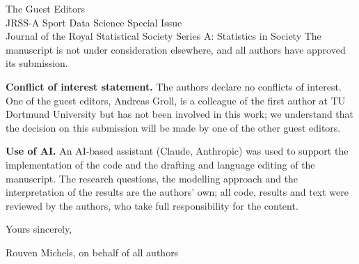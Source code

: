 \documentclass[11pt,a4paper]{letter}
\begin{document}
\begin{letter}{The Guest Editors\\ JRSS-A Sport Data Science Special Issue\\ Journal of the Royal Statistical Society Series A: Statistics in Society}
The manuscript is not under consideration elsewhere, and all authors have approved its submission.

\textbf{Conflict of interest statement.} The authors declare no conflicts of interest. One of the guest editors, Andreas Groll, is a colleague of the first author at TU Dortmund University but has not been involved in this work; we understand that the decision on this submission will be made by one of the other guest editors.

\textbf{Use of AI.} An AI-based assistant (Claude, Anthropic) was used to support the implementation of the code and the drafting and language editing of the manuscript. The research questions, the modelling approach and the interpretation of the results are the authors' own; all code, results and text were reviewed by the authors, who take full responsibility for the content.

\par\medskip\noindent Yours sincerely,\par\vspace{2.5em}\noindent Rouven Michels, on behalf of all authors

\end{letter}
\end{document}
